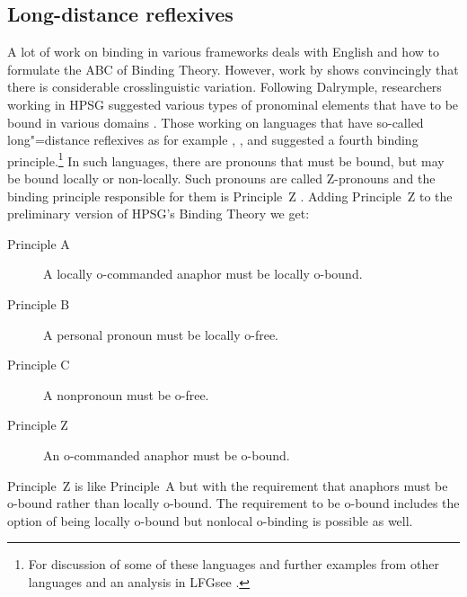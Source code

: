\documentclass[output=paper,biblatex,babelshorthands,newtxmath,draftmode,colorlinks,citecolor=brown]{langscibook}
\begin{document}
\subsection{Long-distance reflexives}

A lot of work on binding in various frameworks deals with English and how to formulate the ABC of
Binding Theory. However, work by \citet{Dalrymple93a} shows convincingly that there is considerable
crosslinguistic variation. Following Dalrymple, researchers working in HPSG suggested various types of pronominal
elements that have to be bound in various domains \citep{AGS1998a,Koenig1999b,XPS94a-u,PX98a,BM99a,Hellan2005a}.
Those working on languages that have so-called long"=distance
reflexives\label{page-long-distance-reflexives} as for example ,
, and 
\citep*{XPS94a-u,PX98a,BM99a,Hellan2005a} suggested a fourth binding principle.\footnote{
For discussion of some of these languages and further examples from other languages and an analysis
in LFG\indexlfg see .
} In such languages, there are pronouns that must be bound, but may be bound locally or non-locally.
Such pronouns are called Z-pronouns and the binding principle responsible for them is
Principle~Z \citep[]{BM99a}. Adding Principle~Z to the preliminary version of HPSG's
Binding Theory we get:
\begin{principle-break}
\begin{description}
\item [Principle A] A locally o-commanded anaphor must be locally o-bound.
\item [Principle B] A personal pronoun must be locally o-free.
\item [Principle C] A nonpronoun must be o-free.
\item [Principle Z] An o-commanded anaphor must be o-bound.
\end{description}
\end{principle-break}
Principle~Z is like Principle~A but with the requirement that anaphors must be o-bound rather than
locally o-bound. The requirement to be o-bound includes the option of being locally o-bound but
nonlocal o-binding is possible as well. 
\end{document}
